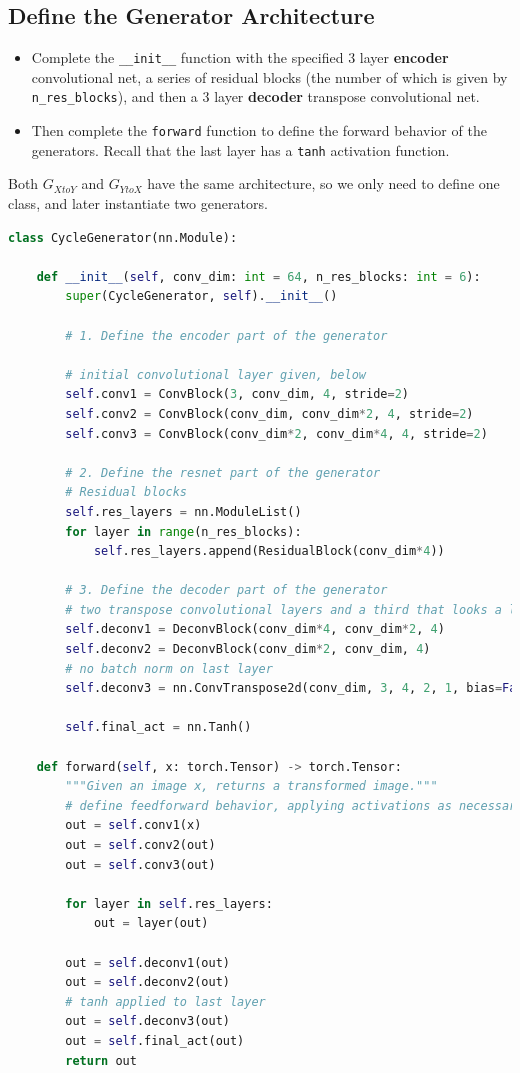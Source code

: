 \subsection{Define the Generator Architecture}

\begin{itemize}
\item Complete the \lstinline{__init__} function with the specified 3 layer \textbf{encoder} convolutional net, a series of residual blocks (the number of which is given by \lstinline{n_res_blocks}), and then a 3 layer \textbf{decoder} transpose convolutional net.
\item Then complete the \lstinline{forward} function to define the forward behavior of the generators. Recall that the last layer has a \lstinline{tanh} activation function.
\end{itemize}

Both \(G_{XtoY}\) and \(G_{YtoX}\) have the same architecture, so we
only need to define one class, and later instantiate two generators.

\begin{lstlisting}[language=Python]
class CycleGenerator(nn.Module):
    
    def __init__(self, conv_dim: int = 64, n_res_blocks: int = 6):
        super(CycleGenerator, self).__init__()

        # 1. Define the encoder part of the generator
        
        # initial convolutional layer given, below
        self.conv1 = ConvBlock(3, conv_dim, 4, stride=2)
        self.conv2 = ConvBlock(conv_dim, conv_dim*2, 4, stride=2)
        self.conv3 = ConvBlock(conv_dim*2, conv_dim*4, 4, stride=2)

        # 2. Define the resnet part of the generator
        # Residual blocks
        self.res_layers = nn.ModuleList()
        for layer in range(n_res_blocks):
            self.res_layers.append(ResidualBlock(conv_dim*4))

        # 3. Define the decoder part of the generator
        # two transpose convolutional layers and a third that looks a lot like the initial conv layer
        self.deconv1 = DeconvBlock(conv_dim*4, conv_dim*2, 4)
        self.deconv2 = DeconvBlock(conv_dim*2, conv_dim, 4)
        # no batch norm on last layer
        self.deconv3 = nn.ConvTranspose2d(conv_dim, 3, 4, 2, 1, bias=False)
        
        self.final_act = nn.Tanh()
        
    def forward(self, x: torch.Tensor) -> torch.Tensor:
        """Given an image x, returns a transformed image."""
        # define feedforward behavior, applying activations as necessary
        out = self.conv1(x)
        out = self.conv2(out)
        out = self.conv3(out)
        
        for layer in self.res_layers:
            out = layer(out)
        
        out = self.deconv1(out)
        out = self.deconv2(out)
        # tanh applied to last layer
        out = self.deconv3(out)
        out = self.final_act(out)
        return out
\end{lstlisting}

